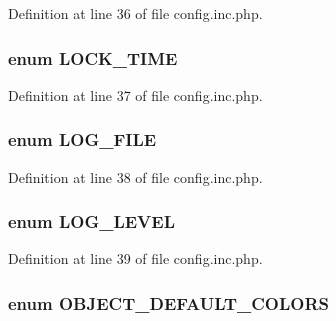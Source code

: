 Definition at line 36 of file config.inc.php.

\hypertarget{config_8inc_8php_a924ae40271cc363050158e36b3823407}{
\subsubsection[{LOCK\_\-TIME}]{\setlength{\rightskip}{0pt plus 5cm}enum {\bf LOCK\_\-TIME}}}
\label{config_8inc_8php_a924ae40271cc363050158e36b3823407}


Definition at line 37 of file config.inc.php.

\hypertarget{config_8inc_8php_a6de83433b64b24349644a4c2d839dcb7}{
\subsubsection[{LOG\_\-FILE}]{\setlength{\rightskip}{0pt plus 5cm}enum {\bf LOG\_\-FILE}}}
\label{config_8inc_8php_a6de83433b64b24349644a4c2d839dcb7}


Definition at line 38 of file config.inc.php.

\hypertarget{config_8inc_8php_aa5a9053636a30269210c54e734e0d583}{
\subsubsection[{LOG\_\-LEVEL}]{\setlength{\rightskip}{0pt plus 5cm}enum {\bf LOG\_\-LEVEL}}}
\label{config_8inc_8php_aa5a9053636a30269210c54e734e0d583}


Definition at line 39 of file config.inc.php.

\hypertarget{config_8inc_8php_a3e205a45d91d7ef191e53487b6b48b3b}{
\subsubsection[{OBJECT\_\-DEFAULT\_\-COLORS}]{\setlength{\rightskip}{0pt plus 5cm}enum {\bf OBJECT\_\-DEFAULT\_\-COLORS}}}
\label{config_8inc_8php_a3e205a45d91d7ef191e53487b6b48b3b}


